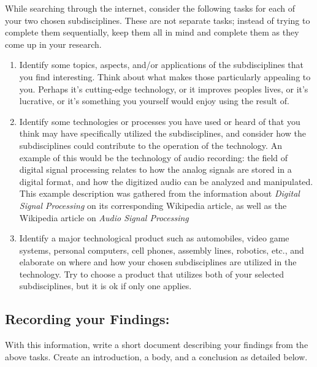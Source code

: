 \documentclass[12pt]{article}
\begin{document}
While searching through the internet, consider the following tasks for each of your two chosen subdisciplines.  These are not separate tasks; instead of trying to complete them sequentially, keep them all in mind and complete them as they come up in your research.
\begin{enumerate}
    \item Identify some topics, aspects, and/or applications of the subdisciplines that you find interesting.  Think about what makes those particularly appealing to you.  Perhaps it's cutting-edge technology, or it improves peoples lives, or it's lucrative, or it's something you yourself would enjoy using the result of.
    \item Identify some technologies or processes you have used or heard of that you think may have specifically utilized the subdisciplines, and consider how the subdisciplines could contribute to the operation of the technology. An example of this would be the technology of audio recording: the field of digital signal processing relates to how the analog signals are stored in a digital format, and how the digitized audio can be analyzed and manipulated. This example description was gathered from the information about \textit{Digital Signal Processing} on its corresponding Wikipedia article, as well as the Wikipedia article on \textit{Audio Signal Processing}
    \item Identify a major technological product such as automobiles, video game systems, personal computers, cell phones, assembly lines, robotics, etc., and elaborate on where and how your chosen subdisciplines are utilized in the technology.  Try to choose a product that utilizes both of your selected subdisciplines, but it is ok if only one applies.
\end{enumerate}

\subsection{Recording your Findings:}

With this information, write a short document describing your findings from the above tasks. Create an introduction, a body, and a conclusion as detailed below.
\end{document}

